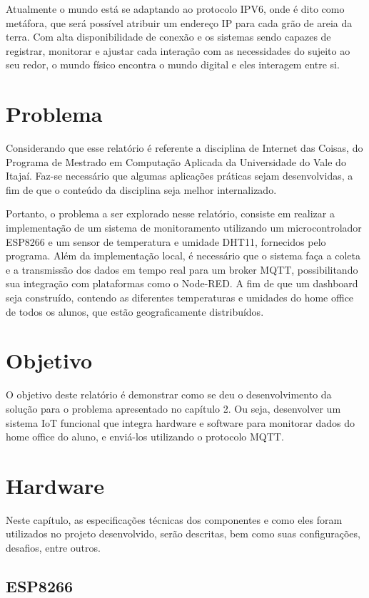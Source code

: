 \documentclass[12pt]{article}
\begin{document}
Atualmente o mundo está se adaptando ao protocolo IPV6, onde é dito como metáfora, que será possível atribuir um endereço IP para cada grão de areia da terra. Com alta disponibilidade de conexão e os sistemas sendo capazes de registrar, monitorar e ajustar cada interação com as necessidades do sujeito ao seu redor, o mundo físico encontra o mundo digital e eles interagem entre si.

\section{Problema}

Considerando que esse relatório é referente a disciplina de Internet das Coisas, do Programa de Mestrado em Computação Aplicada da Universidade do Vale do Itajaí. Faz-se necessário que algumas aplicações práticas sejam desenvolvidas, a fim de que o conteúdo da disciplina seja melhor internalizado.

Portanto, o problema a ser explorado nesse relatório, consiste em realizar a implementação de um sistema de monitoramento utilizando um microcontrolador ESP8266 e um sensor de temperatura e umidade DHT11, fornecidos pelo programa. Além da implementação local, é necessário que o sistema faça a coleta e a transmissão dos dados em tempo real para um broker MQTT, possibilitando sua integração com plataformas como o Node-RED. A fim de que um dashboard seja construído, contendo as diferentes temperaturas e umidades do home office de todos os alunos, que estão geograficamente distribuídos.

\section{Objetivo}

O objetivo deste relatório é demonstrar como se deu o desenvolvimento da solução para o problema apresentado no capítulo 2. Ou seja, desenvolver um sistema IoT funcional que integra hardware e software para monitorar dados do home office do aluno, e enviá-los utilizando o protocolo MQTT. 

\section{Hardware}

Neste capítulo, as especificações técnicas dos componentes e como eles foram utilizados no projeto desenvolvido, serão descritas, bem como suas configurações, desafios, entre outros.
\subsection{ESP8266}
\end{document}
